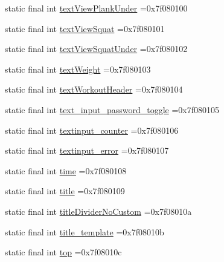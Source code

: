 \begin{DoxyCompactItemize}
\item 
static final int \mbox{\hyperlink{classcom_1_1example_1_1trainawearapplication_1_1_r_1_1id_ac25d082a84cc5a228ed7b78ec4ab7c49}{text\+View\+Plank\+Under}} =0x7f080100
\item 
static final int \mbox{\hyperlink{classcom_1_1example_1_1trainawearapplication_1_1_r_1_1id_aaeddaee2f3e6f776e6651b5126a5d103}{text\+View\+Squat}} =0x7f080101
\item 
static final int \mbox{\hyperlink{classcom_1_1example_1_1trainawearapplication_1_1_r_1_1id_ac5b647b6eff03a6cebd63aea9a649ce6}{text\+View\+Squat\+Under}} =0x7f080102
\item 
static final int \mbox{\hyperlink{classcom_1_1example_1_1trainawearapplication_1_1_r_1_1id_a503e027b6a16bcd55a07778089188205}{text\+Weight}} =0x7f080103
\item 
static final int \mbox{\hyperlink{classcom_1_1example_1_1trainawearapplication_1_1_r_1_1id_a06bfee63faf8344930f419b8fea80f09}{text\+Workout\+Header}} =0x7f080104
\item 
static final int \mbox{\hyperlink{classcom_1_1example_1_1trainawearapplication_1_1_r_1_1id_a1d989bc82557a71d03839a390a9876b1}{text\+\_\+input\+\_\+password\+\_\+toggle}} =0x7f080105
\item 
static final int \mbox{\hyperlink{classcom_1_1example_1_1trainawearapplication_1_1_r_1_1id_a81d42fc142a683ce3ffec26570f4d770}{textinput\+\_\+counter}} =0x7f080106
\item 
static final int \mbox{\hyperlink{classcom_1_1example_1_1trainawearapplication_1_1_r_1_1id_afeb0b99d831ea9701f2a7499e8622998}{textinput\+\_\+error}} =0x7f080107
\item 
static final int \mbox{\hyperlink{classcom_1_1example_1_1trainawearapplication_1_1_r_1_1id_ab5a751938b52332d94f872634e021124}{time}} =0x7f080108
\item 
static final int \mbox{\hyperlink{classcom_1_1example_1_1trainawearapplication_1_1_r_1_1id_aa4b47716890b9599739141933f5fc2c5}{title}} =0x7f080109
\item 
static final int \mbox{\hyperlink{classcom_1_1example_1_1trainawearapplication_1_1_r_1_1id_ad2802f3f791b9d80961881d733d9484c}{title\+Divider\+No\+Custom}} =0x7f08010a
\item 
static final int \mbox{\hyperlink{classcom_1_1example_1_1trainawearapplication_1_1_r_1_1id_adbd36ae57dac5c40c1654f9ac7895880}{title\+\_\+template}} =0x7f08010b
\item 
static final int \mbox{\hyperlink{classcom_1_1example_1_1trainawearapplication_1_1_r_1_1id_ac9e9e40b5b2073e1c3daccdd7480ee8c}{top}} =0x7f08010c

\end{DoxyCompactItemize}

